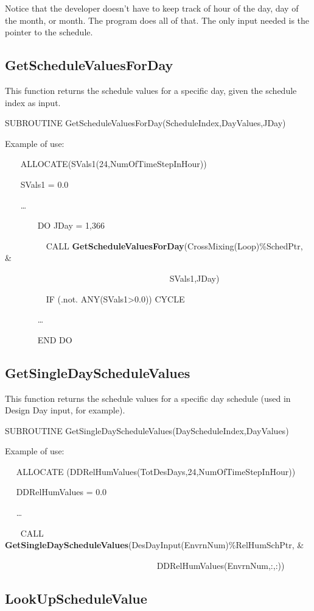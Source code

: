Notice that the developer doesn't have to keep track of hour of the day, day of the month, or month. The program does all of that. The only input needed is the pointer to the schedule.

\subsection{GetScheduleValuesForDay}\label{getschedulevaluesforday}

This function returns the schedule values for a specific day, given the schedule index as input.

SUBROUTINE GetScheduleValuesForDay(ScheduleIndex,DayValues,JDay)

Example of use:

~~~ ALLOCATE(SVals1(24,NumOfTimeStepInHour))

~~~ SVals1 = 0.0

~~~ \ldots{}

~~~~~~~ DO JDay = 1,366

~~~~~~~~~ CALL \textbf{GetScheduleValuesForDay}(CrossMixing(Loop)\%SchedPtr,~ \&

~~~~~~~~~~~~~~~~~~~~~~~~~~~~ ~~~~~~~~~~SVals1,JDay)

~~~~~~~~~ IF (.not. ANY(SVals1\textgreater{}0.0)) CYCLE

~~~~~~~ \ldots{}

~~~~~~~ END DO

\subsection{GetSingleDayScheduleValues}\label{getsingledayschedulevalues}

This function returns the schedule values for a specific day schedule (used in Design Day input, for example).

SUBROUTINE GetSingleDayScheduleValues(DayScheduleIndex,DayValues)

Example of use:

~~ ALLOCATE (DDRelHumValues(TotDesDays,24,NumOfTimeStepInHour))

~~ DDRelHumValues = 0.0

~~ \ldots{}

~~~ CALL \textbf{GetSingleDayScheduleValues}(DesDayInput(EnvrnNum)\%RelHumSchPtr, \&

~~~~~~~~~~~~~~~~~~~~~~~~~~~~~~~~~~~ DDRelHumValues(EnvrnNum,:,:))

\subsection{LookUpScheduleValue}\label{lookupschedulevalue}

